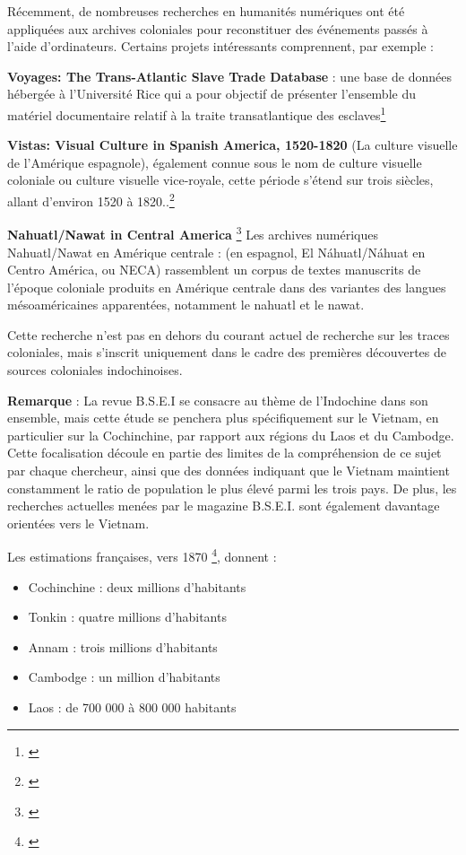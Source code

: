 Récemment, de nombreuses recherches en humanités numériques ont été appliquées aux archives coloniales pour reconstituer des événements passés à l'aide d'ordinateurs. Certains projets intéressants comprennent, par exemple :

\textbf{Voyages: The Trans-Atlantic Slave Trade Database} : une base de données hébergée à l'Université Rice qui a pour objectif de présenter l'ensemble du matériel documentaire relatif à la traite transatlantique des esclaves\footnote{\cite{slave}}

\textbf{Vistas: Visual Culture in Spanish America, 1520-1820} (La culture visuelle de l'Amérique espagnole), également connue sous le nom de culture visuelle coloniale ou culture visuelle vice-royale, cette période s'étend sur trois siècles, allant d'environ 1520 à 1820..\footnote{\cite{visual}}

\textbf{Nahuatl/Nawat in Central America} \footnote{\cite{nana}} Les archives numériques Nahuatl/Nawat en Amérique centrale : (en espagnol, El Náhuatl/Náhuat en Centro América, ou NECA) rassemblent un corpus de textes manuscrits de l'époque coloniale produits en Amérique centrale dans des variantes des langues mésoaméricaines apparentées, notamment le nahuatl et le nawat.

Cette recherche n'est pas en dehors du courant actuel de recherche sur les traces coloniales, mais s'inscrit uniquement dans le cadre des premières découvertes de sources coloniales indochinoises.

\textbf{Remarque} : La revue B.S.E.I se consacre au thème de l'Indochine dans son ensemble, mais cette étude se penchera plus spécifiquement sur le Vietnam, en particulier sur la Cochinchine, par rapport aux régions du Laos et du Cambodge. Cette focalisation découle en partie des limites de la compréhension de ce sujet par chaque chercheur, ainsi que des données indiquant que le Vietnam maintient constamment le ratio de population le plus élevé parmi les trois pays. De plus, les recherches actuelles menées par le magazine B.S.E.I. sont également davantage orientées vers le Vietnam.

Les estimations françaises, vers 1870 \footnote{\cite{paris_2016}}, donnent :

\begin{itemize}
    \item Cochinchine : deux millions d'habitants
    \item Tonkin : quatre millions d'habitants
    \item Annam : trois millions d'habitants
    \item Cambodge : un million d'habitants
    \item Laos : de 700 000 à 800 000 habitants
\end{itemize}

